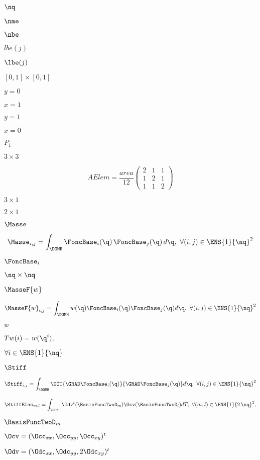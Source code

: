 \documentclass{article}
\begin{document}
$\nq$
\pagebreak

$\nme$
\pagebreak

$\nbe$
\pagebreak

$lbe(j)$
\pagebreak

$\lbe(j)$
\pagebreak

$[0,1]\times[0,1]$
\pagebreak

$y=0$
\pagebreak

$x=1$
\pagebreak

$y=1$
\pagebreak

$x=0$
\pagebreak

$P_1$
\pagebreak

$3\times 3$
\pagebreak

\[AElem=\frac{area}{12}\left( \begin{array}{ccc} 2 &1 &1 \\ 1 &2 &1 \\ 1 &1 &2 \end{array} \right)\]
\pagebreak

$3\times 1$
\pagebreak

$2\times 1$
\pagebreak

$\Masse$
\pagebreak

\[\Masse_{i,j}=\int_\DOMH \FoncBase_i(\q)\, \FoncBase_j(\q)\, d\q,\ \forall (i,j)\in{\ENS{1}{\nq}}^2\]
\pagebreak

$\FoncBase_i$
\pagebreak

$\nq\times\nq$
\pagebreak

$\MasseF{w}$
\pagebreak

\[\MasseF{w}_{i,j}=\int_\DOMH w(\q)\FoncBase_i(\q) \FoncBase_j(\q) d\q,\ \forall (i,j)\in{\ENS{1}{\nq}}^2\]
\pagebreak

$w$
\pagebreak

$Tw(i)=w(\q^i),$
\pagebreak

$\forall i\in\ENS{1}{\nq}$
\pagebreak

$\Stiff$
\pagebreak

\[\Stiff_{i,j}=\int_\DOMH \DOT{\GRAD\FoncBase_i(\q)}{\GRAD\FoncBase_j(\q)}d\q,\ \forall (i,j)\in{\ENS{1}{\nq}}^2\]
\pagebreak

\[\StiffElas_{m,l}=\int_{\DOMH} \Odv^t(\BasisFuncTwoD_m) \Ocv(\BasisFuncTwoD_l)dT, \ \forall (m,l)\in\ENS{1}{2\,\nq}^2,\]
\pagebreak

$\BasisFuncTwoD_m$
\pagebreak

$\Ocv=(\Occ_{xx},\Occ_{yy},\Occ_{xy})^t$
\pagebreak

$\Odv=(\Odc_{xx},\Odc_{yy},2\Odc_{xy})^t$
\pagebreak
\end{document}
